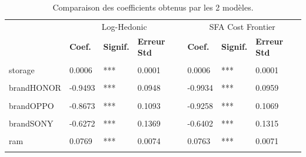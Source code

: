 \documentclass[
  12pt,
]{report}
\begin{document}
\begin{table}[!h]
\centering
\caption{\label{tab:loghedonic_sfa_comp}Comparaison des coefficients obtenus par les 2 modèles.}
\centering
\begin{tabular}[t]{lllllll}
\toprule
\multicolumn{1}{c}{ } & \multicolumn{3}{c}{Log-Hedonic} & \multicolumn{3}{c}{SFA Cost Frontier} \\
\cmidrule(l{3pt}r{3pt}){2-4} \cmidrule(l{3pt}r{3pt}){5-7}
\textbf{ } & \textbf{Coef.} & \textbf{Signif.} & \textbf{Erreur Std} & \textbf{Coef.} & \textbf{Signif.} & \textbf{Erreur Std}\\
\midrule
\cellcolor{gray!10}{(Intercept)} & \cellcolor{gray!10}{4.8489} & \cellcolor{gray!10}{***} & \cellcolor{gray!10}{0.2826} & \cellcolor{gray!10}{4.7458} & \cellcolor{gray!10}{***} & \cellcolor{gray!10}{0.2728}\\
storage & 0.0006 & *** & 0.0001 & 0.0006 & *** & 0.0001\\
\cellcolor{gray!10}{brandGOOGLE} & \cellcolor{gray!10}{-0.533} & \cellcolor{gray!10}{***} & \cellcolor{gray!10}{0.0908} & \cellcolor{gray!10}{-0.5947} & \cellcolor{gray!10}{***} & \cellcolor{gray!10}{0.0907}\\
brandHONOR & -0.9493 & *** & 0.0948 & -0.9934 & *** & 0.0959\\
\cellcolor{gray!10}{brandMOTOROLA} & \cellcolor{gray!10}{-0.9409} & \cellcolor{gray!10}{***} & \cellcolor{gray!10}{0.0669} & \cellcolor{gray!10}{-0.9844} & \cellcolor{gray!10}{***} & \cellcolor{gray!10}{0.0677}\\
\addlinespace
brandOPPO & -0.8673 & *** & 0.1093 & -0.9258 & *** & 0.1069\\
\cellcolor{gray!10}{brandSAMSUNG} & \cellcolor{gray!10}{-0.4111} & \cellcolor{gray!10}{***} & \cellcolor{gray!10}{0.0855} & \cellcolor{gray!10}{-0.496} & \cellcolor{gray!10}{***} & \cellcolor{gray!10}{0.0914}\\
brandSONY & -0.6272 & *** & 0.1369 & -0.6402 & *** & 0.1315\\
\cellcolor{gray!10}{brandXIAOMI} & \cellcolor{gray!10}{-1.0045} & \cellcolor{gray!10}{***} & \cellcolor{gray!10}{0.0646} & \cellcolor{gray!10}{-1.0341} & \cellcolor{gray!10}{***} & \cellcolor{gray!10}{0.0645}\\
ram & 0.0769 & *** & 0.0074 & 0.0763 & *** & 0.0071\\
\addlinespace
\cellcolor{gray!10}{inductionTRUE} & \cellcolor{gray!10}{0.2123} & \cellcolor{gray!10}{***} & \cellcolor{gray!10}{0.0441} & \cellcolor{gray!10}{0.2185} & \cellcolor{gray!10}{***} & \cellcolor{gray!10}{0.0435}\\

\end{tabular}
\end{table}
\end{document}
